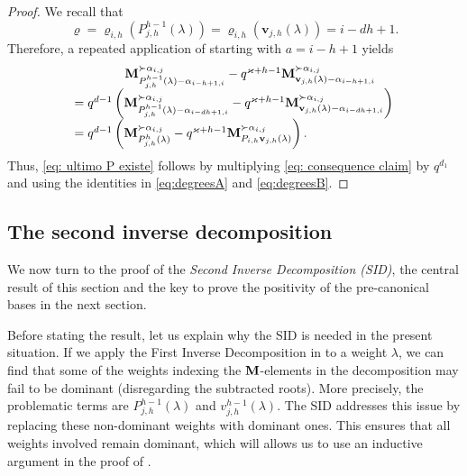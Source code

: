 \begin{proof}
We recall that
\begin{equation}
    \varrho = \varrho_{i,h}(P_{j,h}^{h-1} (\lambda)) = \varrho_{i,h} (  \mathbf{v}_{j,h}(\lambda) ) = i -dh+1.
\end{equation}
Therefore, a repeated application of  starting with $a=i-h+1$ yields
\begin{equation} \label{eq: consequence claim}
\begin{array}{l}
  \qquad\quad\quad \mathbf{M}_{P_{j,h}^{h-1}(\lambda) - \alpha_{i-h+1,i}}^{\succ \alpha_{i,j}} - q^{\varkappa+h-1} \mathbf{M}_{\mathbf{v}_{j,h}(\lambda)-\alpha_{i-h+1,i}}^{\succ \alpha_{i,j}}  
     \\ = q^{d-1}  \left( \mathbf{M}_{P_{j,h}^{h-1}(\lambda)-\alpha_{i-dh+1,i}}^{\succ \alpha_{i,j}} - q^{\varkappa+h-1} \mathbf{M}_{\mathbf{v}_{j,h}(\lambda)- \alpha_{i-dh+1,i}}^{\succ \alpha_{i,j}} \right) \\
     = q^{d-1}  \left( \mathbf{M}_{P_{j,h}^{h}(\lambda)}^{\succ \alpha_{i,j}} - q^{\varkappa+h-1} \mathbf{M}_{P_{i,h}\mathbf{v}_{j,h}(\lambda)}^{\succ \alpha_{i,j}} \right).
\end{array}
\end{equation}  
Thus, \eqref{eq: ultimo P existe} follows by multiplying \eqref{eq: consequence claim} by $q^{d_1}$ and using the identities in \eqref{eq:degreesA} and \eqref{eq:degreesB}.
\end{proof}


\subsection{The second inverse decomposition}

We now turn to the proof of the \emph{Second Inverse Decomposition (SID)}, the central result of this section and the key to prove the positivity of the pre-canonical bases in the next section.

Before stating the result,  let us explain why the SID is needed in the present situation.
If we apply the First Inverse Decomposition in  to a weight $\lambda$, we can find that some of the weights indexing the $\mathbf{M}$-elements in the decomposition may fail to be dominant (disregarding the subtracted roots).
More precisely, the problematic terms are $P_{j,h}^{h-1}(\lambda)$ and $v_{j,h}^{h-1}(\lambda)$.
The SID addresses this issue by replacing these non-dominant weights with dominant ones.
This ensures that all weights involved remain dominant, which will allows us to use an inductive argument  in the proof of .

